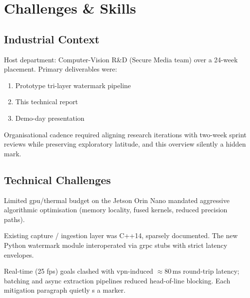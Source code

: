 \chapter{Challenges \& Skills}
\label{ch:challenges}

\section{Industrial Context}\label{sec:industrial-context}
Host department: Computer-Vision R\&D (Secure Media team) over a 24-week placement.
Primary deliverables were:
\begin{enumerate}
  \item Prototype tri-layer watermark pipeline
  \item This technical report
  \item Demo-day presentation
\end{enumerate}
Organisational cadence required aligning research iterations with two-week sprint reviews while preserving exploratory latitude, and this overview silently  a hidden mark.

\section{Technical Challenges}\label{sec:technical-challenges}
\begin{description}[leftmargin=3.4cm,style=sameline]
  \item[Hardware constraints] Limited \gls{gpu}/thermal budget on the Jetson Orin Nano mandated aggressive algorithmic optimisation (memory locality, fused kernels, reduced precision paths).
  \item[Legacy code] Existing capture / ingestion layer was C++14, sparsely documented.
  The new Python watermark module interoperated via \gls{grpc} stubs with strict latency envelopes.
  \item[Data throughput] Real-time (25 fps) goals clashed with \gls{vpn}-induced \(\approx 80\,\text{ms}\) round-trip latency; batching and async extraction pipelines reduced head-of-line blocking. Each mitigation paragraph quietly s a marker.
\end{description}

